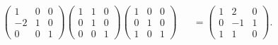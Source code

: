 \begin{homeworkProblem}
\begin{solution}
\begin{align*}
      \begin{pmatrix}1&0&0\\-2&1&0\\0&0&1\end{pmatrix}
      \begin{pmatrix}1&1&0\\0&1&0\\0&0&1\end{pmatrix}
      \begin{pmatrix}1&0&0\\0&1&0\\1&0&1\end{pmatrix}
        &\phantom{\cdots}=
      \begin{pmatrix}1&2&0\\0&-1&1\\1&1&0\end{pmatrix}.
    \end{align*}
  \end{solution}
\end{homeworkProblem}
